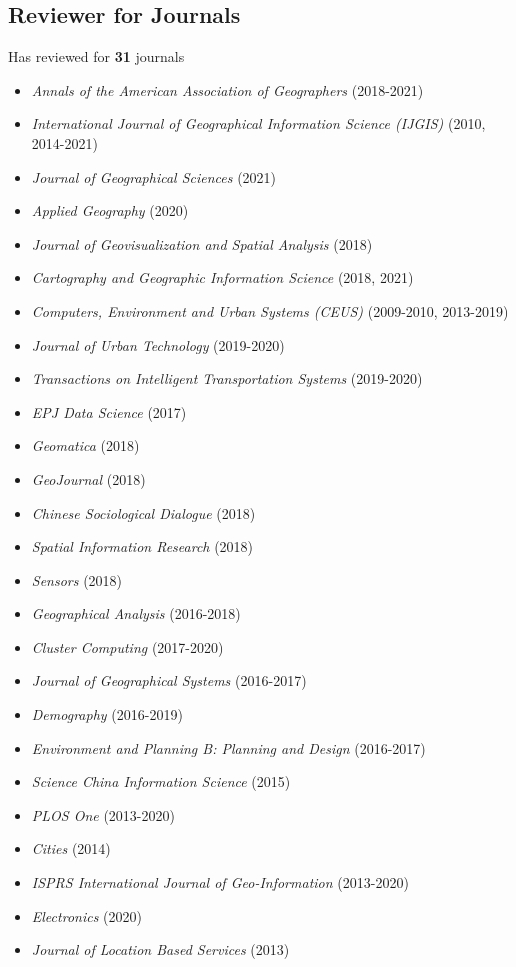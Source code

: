 \documentclass[11pt, a4paper]{article}
\begin{document}
\subsection*{Reviewer for Journals}
Has reviewed for \textbf{31} journals
\begin{itemize}
  \setlength\itemsep{0em}
  \item \emph{Annals of the American Association of Geographers} (2018-2021)  
  \item \emph{International Journal of Geographical Information Science (IJGIS)} (2010, 2014-2021)
  \item \emph{Journal of Geographical Sciences} (2021)
  \item \emph{Applied Geography} (2020)  
  \item \emph{Journal of Geovisualization and Spatial Analysis} (2018)
  \item \emph{Cartography and Geographic Information Science} (2018, 2021)
  \item \emph{Computers, Environment and Urban Systems (CEUS)} (2009-2010, 2013-2019)
  \item \emph{Journal of Urban Technology} (2019-2020)
  \item \emph{Transactions on Intelligent Transportation Systems} (2019-2020)
  \item \emph{EPJ Data Science} (2017)
  \item \emph{Geomatica} (2018)
  \item \emph{GeoJournal} (2018)
  \item \emph{Chinese Sociological Dialogue} (2018)
  \item \emph{Spatial Information Research} (2018)
  \item \emph{Sensors} (2018)
  \item \emph{Geographical Analysis} (2016-2018)
  \item \emph{Cluster Computing} (2017-2020)
  \item \emph{Journal of Geographical Systems} (2016-2017)
  \item \emph{Demography} (2016-2019)
  \item \emph{Environment and Planning B: Planning and Design} (2016-2017)
  \item \emph{Science China Information Science} (2015)
  \item \emph{PLOS One} (2013-2020)
  \item \emph{Cities} (2014)
  \item \emph{ISPRS International Journal of Geo-Information} (2013-2020)
  \item \emph{Electronics} (2020)
  \item \emph{Journal of Location Based Services} (2013)
\end{itemize} 
\end{document}
